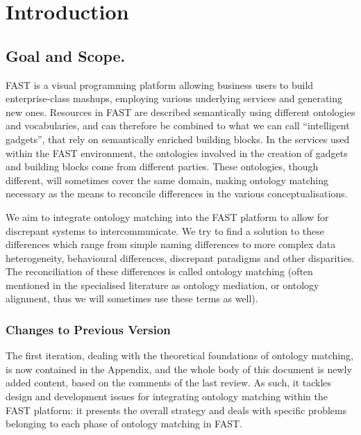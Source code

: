 \documentclass{fast_latex}
\begin{document}
\section{Introduction} %
\label{sec:intro}
\subsection{Goal and Scope.}
FAST is a visual programming platform allowing business users to build enterprise-class mashups, employing various underlying services and generating new ones. Resources in FAST are described semantically using different ontologies and vocabularies, and can therefore be combined to what we can call ``intelligent gadgets'', that rely on semantically enriched building blocks. In the services used within the FAST environment, the ontologies involved in the creation of gadgets and building blocks come from different parties. These ontologies, though different, will sometimes cover the same domain, making ontology matching necessary as the means to reconcile differences in the various conceptualisations.

We aim to integrate ontology matching into the FAST platform to allow for discrepant systems to intercommunicate.  We try to find a solution to these differences which range from simple naming differences to more complex data heterogeneity, behavioural differences, discrepant paradigms and other disparities. The reconciliation of these differences is called ontology matching (often mentioned in the specialised literature as ontology mediation, or ontology alignment, thus we will sometimes use these terms as well). 

\subsubsection{Changes to Previous Version}

The first iteration, dealing with the theoretical foundations of ontology matching, is now contained in the Appendix, and the whole body of this document is newly added content, based on the comments of the last review. As such, it tackles design and development issues for integrating ontology matching within the FAST platform: it presents the overall strategy and deals with specific problems belonging to each phase of ontology matching in FAST.
\end{document}
